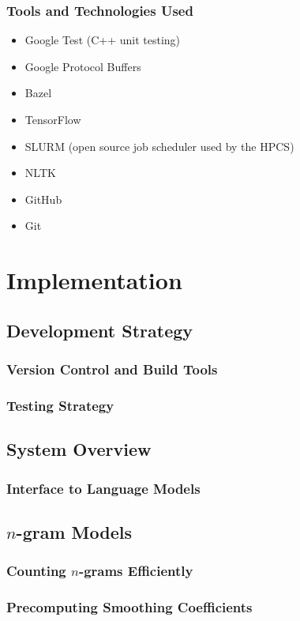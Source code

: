 \documentclass[a4paper, 12pt]{report}
\begin{document}
\subsection{Tools and Technologies Used}
\begin{itemize}
\item
	Google Test (C++ unit testing)
\item
	Google Protocol Buffers
\item
	Bazel
\item
	TensorFlow
\item
	SLURM (open source job scheduler used by the HPCS)
\item
	NLTK
\item
	GitHub
\item
	Git
\end{itemize}

\chapter{Implementation}
\section{Development Strategy}
\subsection{Version Control and Build Tools}
\subsection{Testing Strategy}
\section{System Overview}
\subsection{Interface to Language Models}
\section{$n$-gram Models}
\subsection{Counting $n$-grams Efficiently}
\subsection{Precomputing Smoothing Coefficients}
\end{document}
